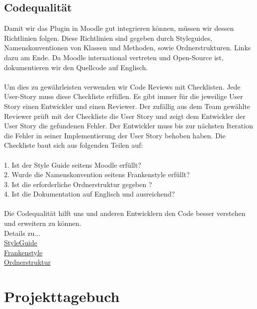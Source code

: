 \documentclass[accentcolor=tud0b,12pt,paper=a4]{tudreport}
\begin{document}
        \section{Codequalität}
Damit wir das Plugin in Moodle gut integrieren können, müssen wir dessen Richtlinien folgen. Diese Richtlinien sind gegeben durch Styleguides, Namenskonventionen von Klassen und Methoden, sowie Ordnerstrukturen. Links dazu am Ende. Da Moodle international vertreten und Open-Source ist, dokumentieren wir den Quellcode auf Englisch.
\\
\\
Um dies zu gewährleisten verwenden wir Code Reviews mit Checklisten. Jede User-Story muss diese Checkliste erfüllen. Es gibt immer für die jeweilige User Story einen Entwickler und einen Reviewer. Der zufällig aus dem Team gewählte Reviewer prüft mit der Checkliste die User Story und zeigt dem Entwickler der User Story die gefundenen Fehler. Der Entwickler muss bis zur nächsten Iteration die Fehler in seiner Implementierung der User Story behoben haben. 
Die Checkliste baut sich aus folgenden Teilen auf:
\\
\\
1. \hspace{0.1cm}Ist der Style Guide seitens Moodle erfüllt?\\
2. \hspace{0.1cm}Wurde die Namenskonvention seitens Frankenstyle erfüllt?\\
3. \hspace{0.1cm}Ist die erforderliche Ordnerstruktur gegeben ?\\
4. \hspace{0.1cm}Ist die Dokumentation auf Englisch und ausreichend?
\\
\\
Die Codequalität hilft uns und anderen Entwicklern den Code besser verstehen und  
erweitern zu können.\\

Details zu... \\
\textcolor{blue}{\href{https://docs.moodle.org/32/en/MoodleDocs:Style_guide}{StyleGuide}}\\
\textcolor{blue}{\href{https://docs.moodle.org/dev/Frankenstyle}{Frankenstyle}}\\
\textcolor{blue}{\href{https://docs.moodle.org/dev/Activity_modules}{Ordnerstruktur}}\\


	
	\chapter{Projekttagebuch}
	
\end{document}
